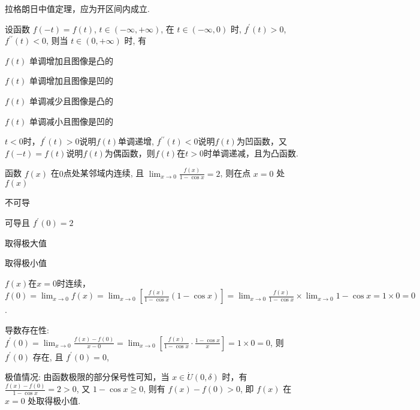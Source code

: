 \documentclass{USTBExam}
\begin{document}
\begin{analysis}
  拉格朗日中值定理，应为开区间内成立.
\end{analysis}

\begin{problem}
  设函数 $f(-t)=f(t)$, $t \in\left(-\infty, +\infty\right)$, 在 $t \in(-\infty, 0)$ 时, $f^{\prime}(t)>0$, $f^{\prime\prime}(t)<0$, 则当 $t \in(0, +\infty)$ 时, 有
  \paren[C]
  \begin{choices}
    \item $f(t)$ 单调增加且图像是凸的
    \item $f(t)$ 单调增加且图像是凹的
    \item $f(t)$ 单调减少且图像是凸的
    \item $f(t)$ 单调减小且图像是凹的
  \end{choices}
\end{problem}

\begin{analysis}
  $t<0$时，$f^{\prime}(t)>0$说明$f(t)$单调递增, $f^{\prime\prime}(t)<0$说明$f(t)$为凹函数，又$f(-t)=f(t)$说明$f(t)$为偶函数，则$f(t)$在$t>0$时单调递减，且为凸函数.
\end{analysis}

\begin{problem}
  函数 $f(x)$ 在$0$点处某邻域内连续, 且 $\lim _{x \to 0} \frac{f(x)}{1-\cos x}=2$, 则在点 $x=0$ 处 $f(x)$
  \paren[D]
  \begin{choices}
    \item 不可导
    \item 可导且 $f^{\prime}(0)=2$
    \item 取得极大值
    \item 取得极小值
  \end{choices}
\end{problem}

\begin{analysis}
  $f(x)$在$x=0$时连续，$f(0) = \lim_{x \to 0} f(x) = \lim _{x \to 0} \left[ \frac{f(x)}{1-\cos x} \left( 1-\cos x \right) \right] = \lim _{x \to 0} \frac{f(x)}{1-\cos x} \times \lim _{x \to 0} 1-\cos x = 1 \times 0 = 0$.

  导数存在性: $f^{\prime}(0)=\lim _{x \to 0} \frac{f(x)-f(0)}{x-0}
    = \lim _{x \to 0}\left[ \frac{f(x)}{1-\cos x} \cdot \frac{1-\cos x}{x} \right]
    = 1 \times 0 = 0$, 则 $f^{\prime}(0)$ 存在, 且 $f^{\prime}(0)=0$,

  极值情况: 由函数极限的部分保号性可知，当 $x \in \dot{U}(0, \delta)$ 时，有$\frac{f(x)-f(0)}{1-\cos x} = 2>0$, 又 $1-\cos x \geqslant 0$, 则有 $f(x)-f(0)>0$, 即 $f(x)$ 在 $x=0$ 处取得极小值.
\end{analysis}
\end{document}
